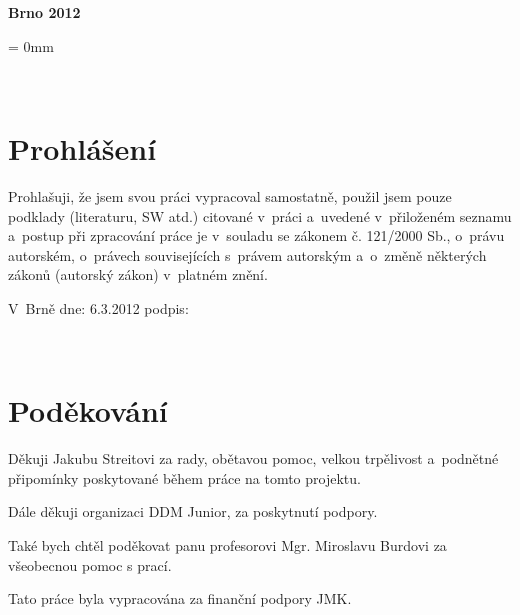 \documentclass[12pt, a4paper, oneside]{article}
\newcommand{\D}{\medskip \noindent} %
\newcommand{\B}{\textbf} %
\begin{document}
\vspace{20mm}

\begin{center}
\B{Brno 2012}

\end{center}
\normalsize
\newpage  %
\voffset = 0mm %

~ %

\vspace{10mm}

\section*{Prohlášení}

Prohlašuji, že jsem svou práci vypracoval samostatně, použil jsem pouze 
podklady (literaturu, SW atd.) citované v~práci a~uvedené v~přiloženém seznamu 
a~postup při zpracování práce je v~souladu se zákonem č. 121/2000 Sb., o~právu 
autorském, o~právech souvisejících s~právem autorským a~o~změně některých 
zákonů (autorský zákon) v~platném znění. 
 
\vspace{20mm} 
 
\noindent V~Brně  dne: 6.3.2012 \hspace{50mm}                 podpis:   
 

\newpage   %

~ %

\vspace{140mm}

\section*{Poděkování}

 Děkuji Jakubu Streitovi za rady, obětavou pomoc, velkou trpělivost a~podnětné připomínky poskytované během práce na tomto projektu. %
 
 Dále děkuji organizaci DDM Junior, za poskytnutí podpory.
 
 Také bych chtěl poděkovat panu profesorovi Mgr. Miroslavu Burdovi za všeobecnou pomoc s prací.  

\D Tato práce byla vypracována za finanční podpory JMK.
 
\end{document}
